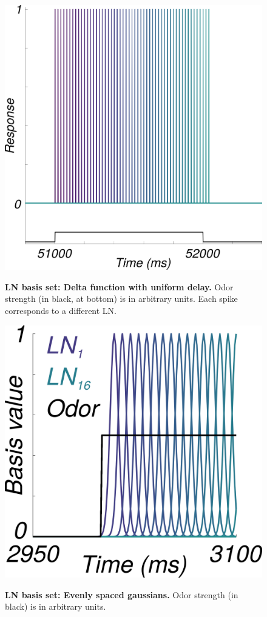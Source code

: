 \documentclass[a4paper,12pt,twoside]{article}
\begin{document}
\begin{figure}
\centering
\caption{\textbf{LN basis set: Delta function with uniform delay.}  Odor strength (in black, at bottom) is in arbitrary units. Each spike corresponds to a different LN. }
\hspace*{-1.0cm}
\includegraphics[scale=0.4]{2016-08-19_LNdelay_basis.png}
\label{fig:ln1}
\end{figure}
\begin{figure}
\centering
\caption{\textbf{LN basis set: Evenly spaced gaussians.}  Odor strength (in black) is in arbitrary units.}
\hspace*{-1.5cm}
\includegraphics[scale=0.7]{2016-08-26_LNgaussianBasis_excerpt.png}
\label{fig:ln2}
\end{figure}
\end{document}
